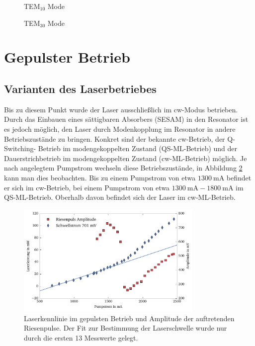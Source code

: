 \documentclass[11pt,twoside=semi]{scrartcl}
\begin{document}
\begin{figure}[H]
  \begin{floatrow}
     {
      \caption{TEM$_{10}$ Mode}
      \label{fig:tem10}
    }
     {
      \caption{TEM$_{30}$ Mode}
      \label{fig:tem20}
    }
  \end{floatrow}
\end{figure}

\newpage

\section{Gepulster Betrieb}
\subsection{Varianten des Laserbetriebes}
Bis zu diesem Punkt wurde der Laser ausschließlich im cw-Modus betrieben. Durch das Einbauen eines
sättigbaren Absorbers (SESAM) in den Resonator ist es jedoch möglich, den Laser durch Modenkopplung im
Resonator in andere Betriebszustände zu bringen. Konkret sind der bekannte cw-Betrieb, der Q-Switching-
Betrieb im modengekoppelten Zustand (QS-ML-Betrieb) und der Dauerstrichbetrieb im modengekoppelten
Zustand (cw-ML-Betrieb) möglich. Je nach angelegtem Pumpstrom wechseln diese Betriebszustände, in
Abbildung \ref{fig:pi_qs_uebergang} kann man dies beobachten. Bis zu einem Pumpstrom von etwa
$\SI{1300}{\milli\ampere}$ befindet er sich im cw-Betrieb, bei einem Pumpstrom von etwa 
$\SI{1300}{\milli\ampere} - \SI{1800}{\milli\ampere}$ im QS-ML-Betrieb. Oberhalb davon befindet
sich der Laser im cw-ML-Betrieb.

\begin{figure}[H]
  \centering
  \includegraphics[width=0.8\textwidth]{./figures/pi_qs_uebergang.pdf}
  \caption{Laserkennlinie im gepulsten Betrieb und Amplitude der auftretenden Riesenpulse. Der Fit
  zur Bestimmung der Laserschwelle wurde nur durch die ersten 13 Messwerte gelegt.}
  \label{fig:pi_qs_uebergang}
\end{figure}
\end{document}
